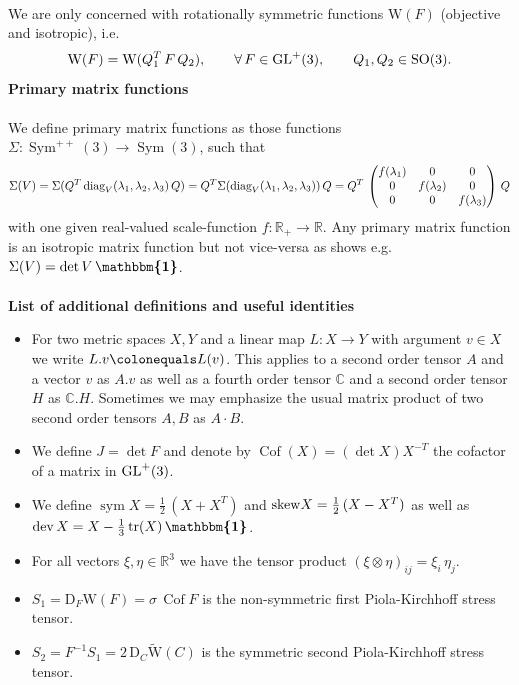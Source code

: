 \documentclass[10pt]{article}
\numberwithin{theoremCounter}{section}
\theoremstyle{plain}
\theoremstyle{definition}
\newcommand{\id}{{\boldsymbol{\mathbbm{1}}}}
\newcommand{\R}{\mathbb{R}}
\newcommand{\DD}{\mathrm{D}}
\newcommand{\WW}{\mathrm{W}}
\DeclareMathOperator{\Sym}{Sym}
\DeclareMathOperator{\Cof}{Cof}
\DeclareMathOperator{\dev}{dev}
\DeclareMathOperator{\sym}{sym}
\DeclareMathOperator{\tr}{tr}
\def\tr{\textnormal{tr}}
\def\sk{\textnormal{skew}}
\def\C{\mathbb{C}}
\numberwithin{equation}{section}
\begin{document}
\begin{appendix}
\\
We are only concerned with rotationally symmetric functions $\WW(F)$ (objective and isotropic), i.e.
	\begin{equation*}
	\WW(F)={\WW}(Q_1^T\, F\, Q_2), \qquad \forall \, F \in {\rm GL}^+(3), \qquad  Q_1 , Q_2 \in {\rm SO}(3).
	\end{equation*}
%
\textbf{Primary matrix functions} \\
\\
We define primary matrix functions as those functions $\Sigma \colon \Sym^{++}(3) \to \Sym(3)$, such that
	\begin{align}
	\Sigma(V) = \Sigma(Q^T \, \textnormal{diag}_V(\lambda_1, \lambda_2, \lambda_3) \, Q) = Q^T \Sigma(\textnormal{diag}_V(\lambda_1, \lambda_2, \lambda_3)) \, Q = Q^T \,
		\begin{pmatrix}
		f(\lambda_1) & 0 & 0 \\
		0 & f(\lambda_2) & 0 \\
		0 & 0 & f(\lambda_3)
		\end{pmatrix} \, Q
	\end{align}
with one given real-valued scale-function $f \colon \mathbb{R}_+ \to \mathbb{R}$. Any primary matrix function is an isotropic matrix function but not vice-versa as shows e.g.~$\Sigma(V) = \det V \, \id$. \\
\\
\textbf{List of additional definitions and useful identities}
%
	\begin{itemize}
	\item For two metric spaces $X, Y$ and a linear map $L: X \to Y$ with argument $v \in X$ we write $L.v\colonequals L(v)$. This applies to a second order tensor $A$ and a vector $v$ as $A.v$ as well as a fourth order tensor $\C$ and a second order tensor $H$ as $\C.H$. Sometimes we may emphasize the usual matrix product of two second order tensors $A, B$ as $A \cdot B$.
	\item We define $J = \det{F}$ and denote by $\Cof(X) = (\det X)X^{-T}$ the cofactor of a matrix in ${\rm GL}^{+}(3)$.
	\item We define $\sym X = \frac12 \, (X + X^T)$ and $\sk X = \frac12 \, (X - X^T)$ as well as $\dev X = X - \frac13 \, \tr(X) \, \id$.
	\item For all vectors $\xi,\eta\in\R^3$ we have the tensor product $(\xi\otimes\eta)_{ij}=\xi_i\,\eta_j$.
	\item $S_1=\DD_F \WW(F) = \sigma \, \Cof F$ is the non-symmetric first Piola-Kirchhoff stress tensor.
	\item $S_2=F^{-1}S_1=2\,\DD_C \widetilde{\WW}(C)$ is the symmetric second  Piola-Kirchhoff stress tensor.

\end{itemize}
\end{appendix}
\end{document}
